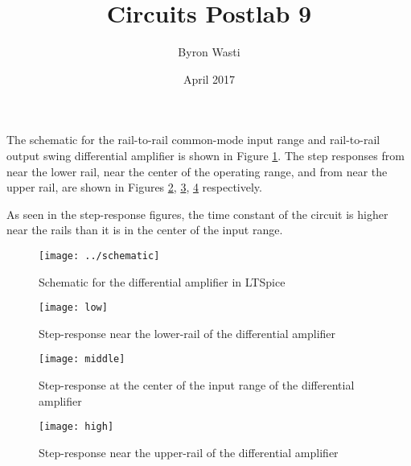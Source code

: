 \documentclass{article}
\title{Circuits Postlab 9}
\author{Byron Wasti}
\date{April 2017}
\begin{document}
\maketitle

The schematic for the rail-to-rail common-mode input range and rail-to-rail output swing differential amplifier is shown in Figure \ref{fig:1}. The step responses from near the lower rail, near the center of the operating range, and from near the upper rail, are shown in Figures \ref{fig:2}, \ref{fig:3}, \ref{fig:4} respectively.

As seen in the step-response figures, the time constant of the circuit is higher near the rails than it is in the center of the input range.

\begin{figure}[ht!]
    \centering
    \texttt{[image: ../schematic]}
    \caption{Schematic for the differential amplifier in LTSpice}
    \label{fig:1}
\end{figure}

\begin{figure}[ht!]
    \centering
    \texttt{[image: low]}
    \caption{Step-response near the lower-rail of the differential amplifier}
    \label{fig:2}
\end{figure}

\begin{figure}[ht!]
    \centering
    \texttt{[image: middle]}
    \caption{Step-response at the center of the input range of the differential amplifier}
    \label{fig:3}
\end{figure}

\begin{figure}[ht!]
    \centering
    \texttt{[image: high]}
    \caption{Step-response near the upper-rail of the differential amplifier}
    \label{fig:4}
\end{figure}
\end{document}
